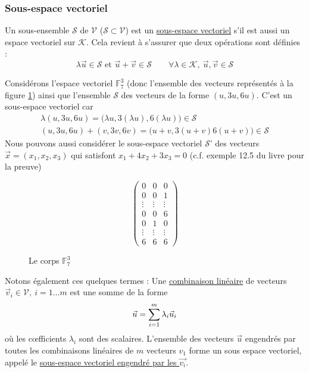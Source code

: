 \documentclass[11pt,a4paper]{article}
\renewcommand{\)}{\right)}
\renewcommand{\(}{\left(}
\newcommand{\m}[1]{\ensuremath{\mathcal{#1}}}
\newcommand{\F}{\ensuremath{\mathbb{F}}}
\begin{document}
\subsubsection{Sous-espace vectoriel}
Un sous-ensemble \m{S} de \m{V} ($\m{S} \subset \m{V}$) est un \uline{sous-espace vectoriel} s'il est aussi un espace vectoriel sur \m{K}. Cela revient à s'assurer que deux opérations sont définies :
\begin{equation*}
	\lambda\vec{u} \in \m{S} \text{ et } \vec{u} + \vec{v} \in \m{S} \qquad \forall \lambda \in \m{K},\ \vec{u},\vec{v} \in \m{S}
\end{equation*}
\begin{exemple}

	Considérons l'espace vectoriel $\F_7^3$ (donc l'ensemble des vecteurs représentés à la figure \ref{corps f37}) ainsi que l'ensemble \m{S} des vecteurs de la forme $(u,3u,6u)$. C'est un sous-espace vectoriel car 
	\begin{align*}
		\lambda(u,3u,6u) = \big(\lambda u,3(\lambda u),6(\lambda u)\big) \in \m{S}\\
		(u,3u,6u)+(v,3v,6v) = \big(u+v, 3(u+v) 6(u+v)\big)\in \m{S}
	\end{align*}
	Nous pouvons aussi considérer le sous-espace vectoriel \m{S}' des vecteurs $\vec{x} = (x_1,x_2,x_3)$ qui satisfont $x_1 + 4x_2 + 3x_3 = 0$ (c.f. exemple 12.5 du livre pour la preuve)
\end{exemple}
\begin{figure}
	\[\begin{pmatrix}
		0 & 0 & 0\\
		0 & 0 & 1\\
		\vdots & \vdots & \vdots\\
		0 & 0 & 6\\
		0 & 1 & 0\\
		\vdots & \vdots & \vdots\\
		6 & 6 & 6
	\end{pmatrix}\]
	\caption{Le corps $\F_7^3$}
	\label{corps f37}
\end{figure}
Notons également ces quelques termes : Une \uline{combinaison linéaire} de vecteurs $\vec{v}_i \in \m{V},\ i= 1\ldots m$ est une somme de la forme 
\begin{equation*}
	\vec{u} = \somme{m}{i=1} \lambda_i\vec{u}_i
\end{equation*}
où les c\oe fficients $\lambda_i$ sont des scalaires. L'ensemble des vecteurs $\vec{u}$ engendrés par toutes les combinaisons linéaires de $m$ vecteurs $v_1$ forme un sous espace vectoriel, appelé le \uline{sous-espace vectoriel engendré par les $\vec{v_i}$}.
\end{document}
